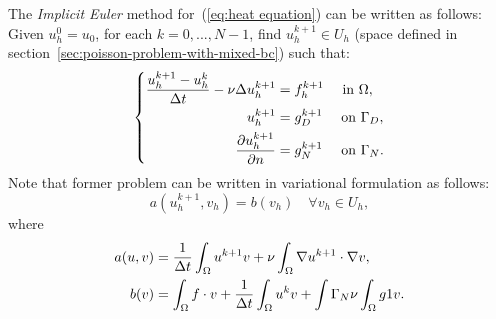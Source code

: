 \documentclass[12pt]{article}
\begin{document}
The \textit{Implicit Euler} method for~(\ref{eq:heat equation}) can be
written as follows:
Given $u^0_h=u_0$, for each $k=0,...,N-1$, find $u^{k+1}_h\in U_h$ (space
defined in section~\ref{sec:poisson-problem-with-mixed-bc}) such that:
\begin{equation}
  \label{eq:euler-implicit-heat-equation}
  \left\{
    \begin{aligned}
      \frac{u^{k+1}_h-u^k_h}{\Delta t} -\nu\Delta u^{k+1}_h &= f^{k+1}_h \quad \text{ in } \Omega, \\
      u^{k+1}_h &= g_D^{k+1} \quad \text{ on } \Gamma_D, \\
      \frac{\partial u^{k+1}_h}{\partial n} &= g_N^{k+1} \quad \text{ on } \Gamma_N.
    \end{aligned}
    \right.
\end{equation}
Note that former problem can be written in variational formulation as follows:
\begin{equation*}
  a(u^{k+1}_h,v_h) = b(v_h) \quad \forall v_h\in U_h,
\end{equation*}
where
\begin{equation*}
    \begin{aligned}
      a(u,v)&=\frac{1}{\Delta t} \int_\Omega u^{k+1} v + \nu\int_\Omega \nabla
      u^{k+1} \cdot \nabla v,
      \\
      b(v)  &= \int_\Omega f \cdot v
      +\frac{1}{\Delta t} \int_\Omega  u^{k} v
      +\int{\Gamma_N} \nu\int_\Omega g1 v.
    \end{aligned}
\end{equation*}
\end{document}
